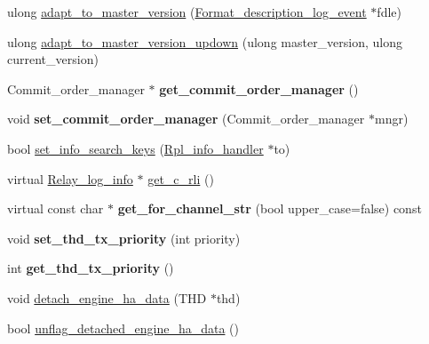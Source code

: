 \begin{DoxyCompactItemize}
ulong \mbox{\hyperlink{classRelay__log__info_a882c4b69a10aec9768aac5a01fad52d7}{adapt\+\_\+to\+\_\+master\+\_\+version}} (\mbox{\hyperlink{classFormat__description__log__event}{Format\+\_\+description\+\_\+log\+\_\+event}} $\ast$fdle)
\item 
ulong \mbox{\hyperlink{classRelay__log__info_ad03fd94a6b3f52af2e271953ea446f85}{adapt\+\_\+to\+\_\+master\+\_\+version\+\_\+updown}} (ulong master\+\_\+version, ulong current\+\_\+version)
\item 
\mbox{\label{classRelay__log__info_aa0ba06ba84cb9d43773d2632b10a1ded}} 
Commit\+\_\+order\+\_\+manager $\ast$ {\bfseries get\+\_\+commit\+\_\+order\+\_\+manager} ()
\item 
\mbox{\label{classRelay__log__info_a4ebb68b5f9bf497037eb38f4fbb4c746}} 
void {\bfseries set\+\_\+commit\+\_\+order\+\_\+manager} (Commit\+\_\+order\+\_\+manager $\ast$mngr)
\item 
bool \mbox{\hyperlink{classRelay__log__info_a41736eb133d061e07653c5207d6913e0}{set\+\_\+info\+\_\+search\+\_\+keys}} (\mbox{\hyperlink{classRpl__info__handler}{Rpl\+\_\+info\+\_\+handler}} $\ast$to)
\item 
virtual \mbox{\hyperlink{classRelay__log__info}{Relay\+\_\+log\+\_\+info}} $\ast$ \mbox{\hyperlink{classRelay__log__info_a2c69ad8016761856f3bcf2851949e39b}{get\+\_\+c\+\_\+rli}} ()
\item 
\mbox{\label{classRelay__log__info_a4e136db090a73932037a1c46837064c4}} 
virtual const char $\ast$ {\bfseries get\+\_\+for\+\_\+channel\+\_\+str} (bool upper\+\_\+case=false) const
\item 
\mbox{\label{classRelay__log__info_a4faab8451d9e84b9b919bbc40df1c5e7}} 
void {\bfseries set\+\_\+thd\+\_\+tx\+\_\+priority} (int priority)
\item 
\mbox{\label{classRelay__log__info_a65bfcf035b94919018f07fd25ddf9cfd}} 
int {\bfseries get\+\_\+thd\+\_\+tx\+\_\+priority} ()
\item 
void \mbox{\hyperlink{classRelay__log__info_a2bf100d2bd9de818e407d4f779a14c8d}{detach\+\_\+engine\+\_\+ha\+\_\+data}} (T\+HD $\ast$thd)
\item 
bool \mbox{\hyperlink{classRelay__log__info_aff59190d1b65e2e5c8aacac048351b3a}{unflag\+\_\+detached\+\_\+engine\+\_\+ha\+\_\+data}} ()
\end{DoxyCompactItemize}
